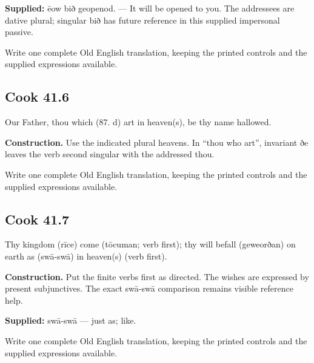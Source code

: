 \textbf{Supplied:} ēow bið geopenod. — It will be opened to you. The addressees are dative plural; singular bið has future reference in this supplied impersonal passive.

Write one complete Old English translation, keeping the printed controls and the supplied expressions available.

\par\begin{minipage}{\linewidth}\raggedright
\subsection*{Cook 41.6}

Our Father, thou which (87. d) art in heaven(s), be thy name hallowed.

\textbf{Construction.} Use the indicated plural heavens. In “thou who art”, invariant ðe leaves the verb second singular with the addressed thou.

Write one complete Old English translation, keeping the printed controls and the supplied expressions available.

\end{minipage}\par\addvspace{4pt}

\par\begin{minipage}{\linewidth}\raggedright
\subsection*{Cook 41.7}

Thy kingdom (rīce) come (tōcuman; verb first); thy will befall (geweorðan) on earth as (swā-swā) in heaven(s) (verb first).

\textbf{Construction.} Put the finite verbs first as directed. The wishes are expressed by present subjunctives. The exact swā-swā comparison remains visible reference help.

\textbf{Supplied:} swā-swā — just as; like.

Write one complete Old English translation, keeping the printed controls and the supplied expressions available.

\end{minipage}\par\addvspace{4pt}

